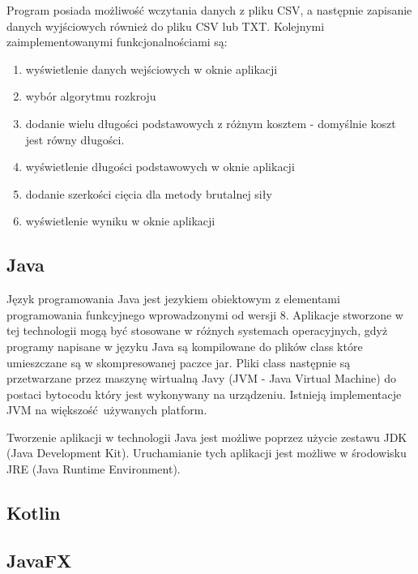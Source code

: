 Program posiada możliwość wczytania danych z pliku CSV, a następnie zapisanie danych wyjściowych również do pliku CSV lub TXT. Kolejnymi zaimplementowanymi funkcjonalnościami są:
\begin{enumerate}
  \item wyświetlenie danych wejściowych w oknie aplikacji
  \item wybór algorytmu rozkroju
  \item dodanie wielu długości podstawowych z różnym kosztem - domyślnie koszt jest równy długości.
  \item wyświetlenie długości podstawowych w oknie aplikacji
  \item dodanie szerkości cięcia dla metody brutalnej siły
  \item wyświetlenie wyniku w oknie aplikacji
\end{enumerate}

\subsection{Java}
Język programowania Java jest jezykiem obiektowym z elementami programowania funkcyjnego wprowadzonymi od wersji 8. Aplikacje stworzone w tej technologii mogą być stosowane w różnych systemach operacyjnych, gdyż programy napisane w języku Java są kompilowane do plików class które umieszczane są w skompresowanej paczce jar. Pliki class następnie są przetwarzane przez maszynę wirtualną Javy (JVM - Java Virtual Machine) do postaci bytocodu który jest wykonywany na urządzeniu. Istnieją implementacje JVM na większość używanych platform.

Tworzenie aplikacji w technologii Java jest możliwe poprzez użycie zestawu JDK (Java Development Kit). Uruchamianie tych aplikacji jest możliwe w środowisku JRE (Java Runtime Environment).
\subsection{Kotlin}
\subsection{JavaFX}
